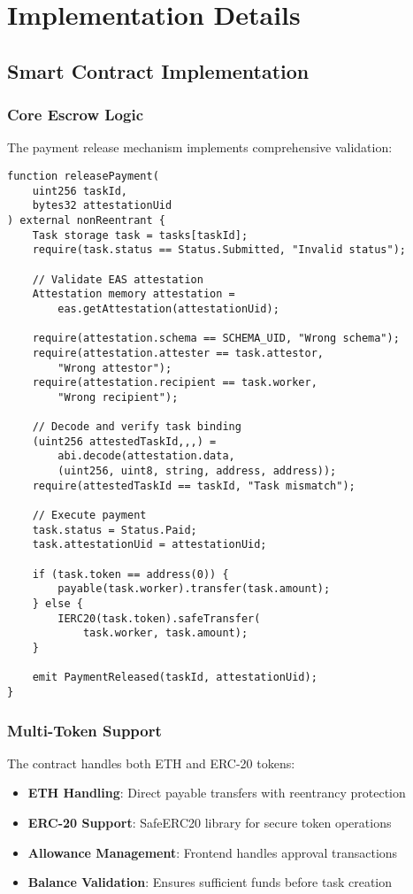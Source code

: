 \documentclass[12pt,a4paper]{article}
\begin{document}
\section{Implementation Details}

\subsection{Smart Contract Implementation}

\subsubsection{Core Escrow Logic}

The payment release mechanism implements comprehensive validation:

\begin{lstlisting}[style=solidity]
function releasePayment(
    uint256 taskId, 
    bytes32 attestationUid
) external nonReentrant {
    Task storage task = tasks[taskId];
    require(task.status == Status.Submitted, "Invalid status");
    
    // Validate EAS attestation
    Attestation memory attestation = 
        eas.getAttestation(attestationUid);
    
    require(attestation.schema == SCHEMA_UID, "Wrong schema");
    require(attestation.attester == task.attestor, 
        "Wrong attestor");
    require(attestation.recipient == task.worker, 
        "Wrong recipient");
    
    // Decode and verify task binding
    (uint256 attestedTaskId,,,) = 
        abi.decode(attestation.data, 
        (uint256, uint8, string, address, address));
    require(attestedTaskId == taskId, "Task mismatch");
    
    // Execute payment
    task.status = Status.Paid;
    task.attestationUid = attestationUid;
    
    if (task.token == address(0)) {
        payable(task.worker).transfer(task.amount);
    } else {
        IERC20(task.token).safeTransfer(
            task.worker, task.amount);
    }
    
    emit PaymentReleased(taskId, attestationUid);
}
\end{lstlisting}

\subsubsection{Multi-Token Support}

The contract handles both ETH and ERC-20 tokens:
\begin{itemize}
    \item \textbf{ETH Handling}: Direct payable transfers with reentrancy protection
    \item \textbf{ERC-20 Support}: SafeERC20 library for secure token operations
    \item \textbf{Allowance Management}: Frontend handles approval transactions
    \item \textbf{Balance Validation}: Ensures sufficient funds before task creation
\end{itemize}
\end{document}
